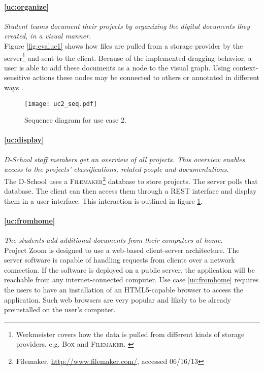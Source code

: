 \paragraph{\ref{uc:organize}} \textit{Student teams document their projects by organizing the digital documents they created, in a visual manner.}\\
Figure \ref{fig:evaluc1} shows how files are pulled from a storage provider by the server\footnote{Werkmeister covers how the data is pulled from different kinds of storage providers, e.g. \textsc{Box} and \textsc{Filemaker}. \cite{Werkmeister_2013}} and sent to the client. Because of the implemented dragging behavior, a user is able to add these documents as a node to the visual graph. Using context-sensitive actions these nodes may be connected to others or annotated in different ways \cite{Herold_2013}. 

\begin{figure}
\begin{center}
\texttt{[image: uc2\_seq.pdf]}
\caption{Sequence diagram for use case 2.}
\label{fig:evaluc2}
\end{center}
\end{figure}

\paragraph{\ref{uc:display}} \textit{D-School staff members get an overview of all projects. This overview enables access to the projects' classifications, related people and documentations.}\\
The D-School uses a \textsc{Filemaker}\footnote{Filemaker, \url{http://www.filemaker.com/}, accessed 06/16/13} database to store projects. The server polls that database. The client can then access them through a REST interface and display them in a user interface. This interaction is outlined in figure \ref{fig:evaluc2}.

\paragraph{\ref{uc:fromhome}} \textit{The students add additional documents from their computers at home.}\\
Project Zoom is designed to use a web-based client-server architecture. The server software is capable of handling requests from clients over a network connection. If the software is deployed on a public server, the application will be reachable from any internet-connected computer. Use case \ref{uc:fromhome} requires the users to have an installation of an HTML5-capable browser to access the application. Such web browsers are very popular and likely to be already preinstalled on the user's computer.

